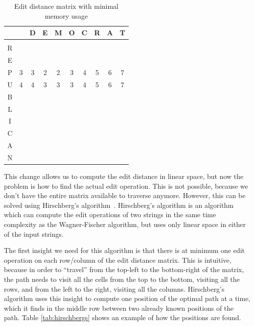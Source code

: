 \begin{table}
	\begin{center}
		\begin{tabular}[c]{c|c|c|c|c|c|c|c|c|c|}
			  &   & D & E & M & O & C & R & A & T \\\hline
			  &   &   &   &   &   &   &   &   &   \\\hline
			R &   &   &   &   &   &   &   &   &   \\\hline
			E &   &   &   &   &   &   &   &   &   \\\hline
			P & 3 & 3 & 2 & 2 & 3 & 4 & 5 & 6 & 7 \\\hline
			U & 4 & 4 & 3 & 3 & 3 & 4 & 5 & 6 & 7 \\\hline
			B &   &   &   &   &   &   &   &   &   \\\hline
			L &   &   &   &   &   &   &   &   &   \\\hline
			I &   &   &   &   &   &   &   &   &   \\\hline
			C &   &   &   &   &   &   &   &   &   \\\hline
			A &   &   &   &   &   &   &   &   &   \\\hline
			N &   &   &   &   &   &   &   &   &   \\\hline
		\end{tabular}
	\end{center}
	\caption{Edit distance matrix with minimal memory usage}
	\label{tab:minimalmemoryusageeditdistance}
\end{table}

This change allows us to compute the edit distance in linear space, but now the problem is
how to find the actual edit operation. This is not possible, because we don't have the
entire matrix available to traverse anymore. However, this can be solved using
Hirschberg's algorithm~\cite{HirschbergsAlgorithm}. Hirschberg's algorithm is an algorithm
which can compute the edit operations of two strings in the same time complexity as the
Wagner-Fischer algorithm, but uses only linear space in either of the input strings.

The first insight we need for this algorithm is that there is at minimum one edit
operation on each row/column of the edit distance matrix. This is intuitive, because in
order to ``travel'' from the top-left to the bottom-right of the matrix, the path needs to
visit all the cells from the top to the bottom, visiting all the rows, and from the left
to the right, visiting all the columns. Hirschberg's algorithm uses this insight to
compute one position of the optimal path at a time, which it finds in the middle row
between two already known positions of the path. Table \ref{tab:hirschbergs} shows an
example of how the positions are found.

